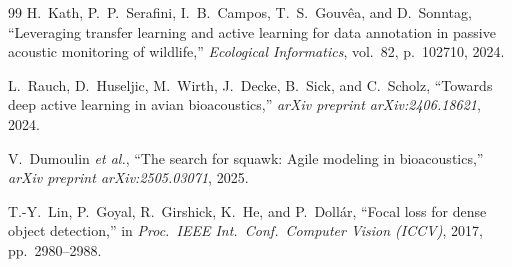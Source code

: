 \documentclass[a4paper,12pt]{article}
\begin{document}
\begin{thebibliography}{99}
H.~Kath, P.~P.~Serafini, I.~B.~Campos, T.~S.~Gouv\^ea, and D.~Sonntag,
``Leveraging transfer learning and active learning for data annotation in passive acoustic
monitoring of wildlife,''
\textit{Ecological Informatics}, vol.~82, p.~102710, 2024.

L.~Rauch, D.~Huseljic, M.~Wirth, J.~Decke, B.~Sick, and C.~Scholz,
``Towards deep active learning in avian bioacoustics,''
\textit{arXiv preprint arXiv:2406.18621}, 2024.

V.~Dumoulin \textit{et al.},
``The search for squawk: Agile modeling in bioacoustics,''
\textit{arXiv preprint arXiv:2505.03071}, 2025.

T.-Y.~Lin, P.~Goyal, R.~Girshick, K.~He, and P.~Doll\'ar,
``Focal loss for dense object detection,''
in \textit{Proc.\ IEEE Int.\ Conf.\ Computer Vision (ICCV)}, 2017, pp.~2980--2988.

\end{thebibliography}
\end{document}
